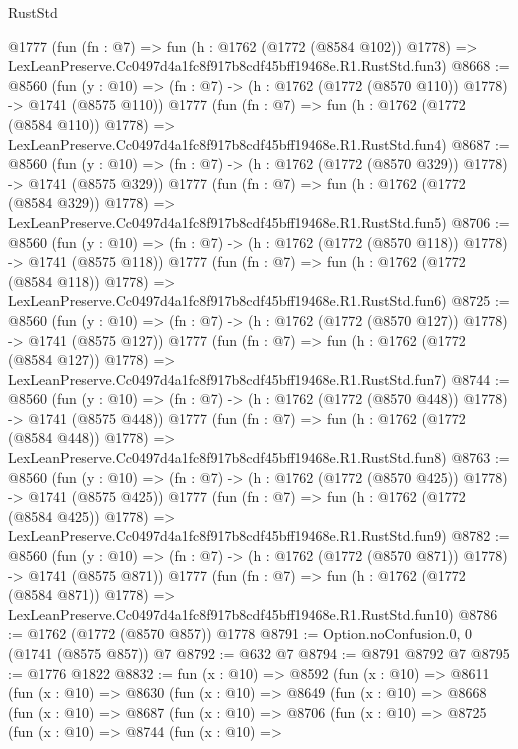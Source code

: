 \begin{lexlean}{RustStd}
\begin{coremodule}
    @1777
    (fun (fn : @7) =>
    fun (h : @1762 (@1772 (@8584 @102)) @1778) =>
    LexLeanPreserve.Cc0497d4a1fc8f917b8cdf45bff19468e.R1.RustStd.fun3)
@8668 := @8560
    (fun (y : @10) => (fn : @7) -> (h : @1762 (@1772 (@8570 @110)) @1778) -> @1741 (@8575 @110))
    @1777
    (fun (fn : @7) =>
    fun (h : @1762 (@1772 (@8584 @110)) @1778) =>
    LexLeanPreserve.Cc0497d4a1fc8f917b8cdf45bff19468e.R1.RustStd.fun4)
@8687 := @8560
    (fun (y : @10) => (fn : @7) -> (h : @1762 (@1772 (@8570 @329)) @1778) -> @1741 (@8575 @329))
    @1777
    (fun (fn : @7) =>
    fun (h : @1762 (@1772 (@8584 @329)) @1778) =>
    LexLeanPreserve.Cc0497d4a1fc8f917b8cdf45bff19468e.R1.RustStd.fun5)
@8706 := @8560
    (fun (y : @10) => (fn : @7) -> (h : @1762 (@1772 (@8570 @118)) @1778) -> @1741 (@8575 @118))
    @1777
    (fun (fn : @7) =>
    fun (h : @1762 (@1772 (@8584 @118)) @1778) =>
    LexLeanPreserve.Cc0497d4a1fc8f917b8cdf45bff19468e.R1.RustStd.fun6)
@8725 := @8560
    (fun (y : @10) => (fn : @7) -> (h : @1762 (@1772 (@8570 @127)) @1778) -> @1741 (@8575 @127))
    @1777
    (fun (fn : @7) =>
    fun (h : @1762 (@1772 (@8584 @127)) @1778) =>
    LexLeanPreserve.Cc0497d4a1fc8f917b8cdf45bff19468e.R1.RustStd.fun7)
@8744 := @8560
    (fun (y : @10) => (fn : @7) -> (h : @1762 (@1772 (@8570 @448)) @1778) -> @1741 (@8575 @448))
    @1777
    (fun (fn : @7) =>
    fun (h : @1762 (@1772 (@8584 @448)) @1778) =>
    LexLeanPreserve.Cc0497d4a1fc8f917b8cdf45bff19468e.R1.RustStd.fun8)
@8763 := @8560
    (fun (y : @10) => (fn : @7) -> (h : @1762 (@1772 (@8570 @425)) @1778) -> @1741 (@8575 @425))
    @1777
    (fun (fn : @7) =>
    fun (h : @1762 (@1772 (@8584 @425)) @1778) =>
    LexLeanPreserve.Cc0497d4a1fc8f917b8cdf45bff19468e.R1.RustStd.fun9)
@8782 := @8560
    (fun (y : @10) => (fn : @7) -> (h : @1762 (@1772 (@8570 @871)) @1778) -> @1741 (@8575 @871))
    @1777
    (fun (fn : @7) =>
    fun (h : @1762 (@1772 (@8584 @871)) @1778) =>
    LexLeanPreserve.Cc0497d4a1fc8f917b8cdf45bff19468e.R1.RustStd.fun10)
@8786 := @1762 (@1772 (@8570 @857)) @1778
@8791 := Option.noConfusion.{0, 0} (@1741 (@8575 @857)) @7
@8792 := @632 @7
@8794 := @8791 @8792 @7
@8795 := @1776 @1822
@8832 := fun (x : @10) =>
  @8592
    (fun (x : @10) =>
    @8611
      (fun (x : @10) =>
      @8630
        (fun (x : @10) =>
        @8649
          (fun (x : @10) =>
          @8668
            (fun (x : @10) =>
            @8687
              (fun (x : @10) =>
              @8706
                (fun (x : @10) =>
                @8725
                  (fun (x : @10) =>
                  @8744
                    (fun (x : @10) =>

\end{coremodule}
\end{lexlean}
